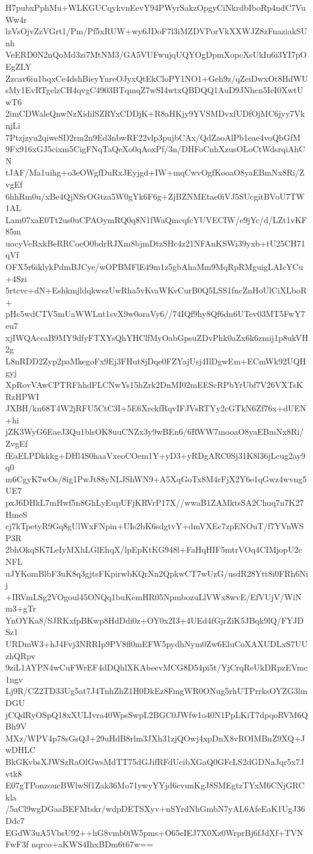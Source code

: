 H7pubxPphMu+WLKGUCqykvnEevY94PWyrSakzOpgyCiNkrdbIboRp4ndC7VuWw4r
lzVsOjvZzVGrt1/Pm/Pf5xRUW+wy6JDoF7l3iMZDVPorVkXXWJZ8zFnaziakSUnh
VeERD0N2nQoMd3zi7MtNM3/GA5VUFwujqUQYOgDpmXopcXsUkIu6i3YI7pOEgZLY
Zzcav6iu1bqxCe4dshBieyYnreOJyxQtEkCloPY1NO1+Geh9z/qZeiDwxOt8HdWU
sMy1EvRTgclzCH4qvgC4903BTqmqZ7wSI4wtxQBDQQ1AuD9JNhcn5IeI0XwtUwT6
2imCDWaleQnwNzXidilSZRYxCDDjK+R8aHKjy9YVSMDvxfUDfOjMC6jyy7VknjLi
7Ptzjzyu2qiweSD2rm2n9Ed3nbwRF22vlp3pujbCAx/QdZaoAlPb1eae4voQbGfM
9Fx916xGJ5cixm5CigFNqTaQeXo0qAoxPf/3n/DHFoCnhXzusOLoCtWdsrqiAhCN
tJAF/Ma1uihg+o3eOWgfDuRxJEyjgd+IW+mqCwvOgfKooaO8yaEBmNx8Ri/ZvgEf
6hhRm0u/xBe4QjNSrOGtza5W0gYk6F6g+ZjBZNMEtae0iVJ5SUcgitBVoU7TW1AL
Lam07xaE0Tt2us0uCPAOymRQ0q8N1fWaQmcqfcYUVECIW/e9jYc/d/LZt1vKF85m
uocyVeRxkBeRRCoeO0bdrRJXm8bjmDtzSHc4z21NFAnKSWi39yxb+tU25CH71qVf
OFX5r6iklykPdmBJCye/wOPBMFlE49m1z5gbAhaMm9MqRpRMguigLAIcYCu+4Szi
5rtcvc+dN+EshkmjldqkwszUwRha5vKvaWKvCurB0Q5LSS1fncZnHoUlCiXLboR+
pHc5wdCTV5mUaWWLnt1svX9w0oraVy6//74IQf9hy8Qf6dn6UTev03MT5FwY7eu7
xjIWQAccaB9MY9dfyFTXYsQhYHClfMyOabGpsuZDvPhk0aZx6k6zmij1p8ukVH2g
L8nRDD2Zyp2paMkegoFx9Ej3FHut8jDqe0FZYajUsj4IlDgwEm+ECmWk92UQHgyj
XpRovVAwCPTRFhhdFLCNwYs15hZrk2DnMI02mEEScRPbYrUbf7V26VXTsKRzHPWI
JXBH/kn68T4W2jRFU5CtC3I+5E6XrckfRqvIFJVsRTYy2cGTkN6Zf76x+dUEN+hi
jZK3WyG6EaeJ3Qu1blsOK8uuCNZx3y9wBEn6/6RWW7mooaO8yaEBmNx8Ri/ZvgEf
fEaELPDkkkg+DHl4S0haaVxeoCOem1Y+yD3+yRDgARC0Sj31K8l36jLcug2ay9q0
m6CgyK7wOs/8ig1PwJt88yNLJShWN9+A5XqGoTx8M4rFjX2Y6e1qGwz4wvng5UE7
pxJ6DHkL7mHwf5n8GhLyEupUFjKRVrP17X//wwaB1ZAMktsSA2Chuq7n7K27HmeS
cj7kTpetyR9Gq8gUlWxFNpin+UIs2bK6sdgtvY+dmVXEc7zpENOuT/f7YVnWSP3R
2bhOkqSK7LeIyMXhLGlEhqX/lpEpKtKG948l+FaHqHIF5mtrVOq4CIMjopU2cNFL
uJYKomBlbF3uK8q3gjtsFKpirwbKQrNn2QpkwCT7wUzG/usdR28Ytt8i0FRh6Nij
+IRVmLSg2VOgoul45ONQq1buKemHR05NpmbozuLlVWx8wvE/EfVUjV/WiNm3+gTr
YnOYKa8/SJRKxfpBKwp8HdDdi0z+OY0x2I3+4UEd4fGjrZiK5JBqk9lQ/FYJDSz1
URDmW3+hJ4Fvj3NRRIp9PV8fl0mEFW5pydhNym0Zw6EluCoXAXUDLxS7UUzhQRpv
9ziL1AYPN4wCuFWrEF4dDQhlXKAbeevMCG8D54pi5t/YjCrqReUkDRpzEVmc1ngv
Lj9R/CZ2TD33Ug5at7J4TnhZhZ1H0DkEz8FmgWR0ONug5rhUTPrrksOYZG3lmDGU
jCQdRyOSpQ18xXULIvra40WpsSwpL2BGC0JWfw1o40N1PpLKiT7dpqoRVM6QBh9V
MXz/WPV4p78sGsQJ+29uHdB8rlm3JXh31zjQOwj4xpDnX8vROIMBnZ9XQ+JwDHLC
BkGKvbsXJWSzRaOlGwsMdTT75dGJifRFdUcibXGaQ0GFcLS2dGDNaJqr5x7Jvtk8
E07gTPonzoucBWlwSf1Zak36Mo71ywyYYjd6cvunKgJ8SMEgtzTYxM6CNjGRCkla
/5aCl9wgDGaaBEFMtskr/wdpDETSXyv+nSYrdNhGmbN7yAL6AfeEaK1UgJ36Ddc7
EGdW3uA5VbsU92++hG8vmb0iW5pms+O65eIEJ7X0Xz0WrprBj6fJdXf+TVNFwF3f
nqrco+aKWS4IhxBDm6t67w==
